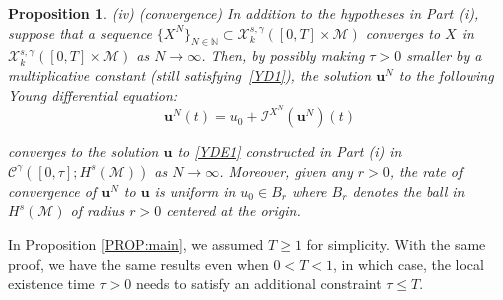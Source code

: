 \documentclass[letterpaper, 11pt,  reqno]{amsart}
\newtheorem{proposition}[theorem]{Proposition}
\newcommand{\1}{\hspace{0.5mm}\text{I}\hspace{0.5mm}}
\newcommand{\I}{\mathcal{I}}
\newcommand{\noi}{\noindent}
\newcommand{\CC}{\mathcal{C}}
\newcommand{\g}{\gamma}
\newcommand{\M}{\mathcal{M}}
\newcommand{\N}{\mathbb{N}}
\newcommand{\cX}{\mathcal{X}}
\newcommand{\uu}{\mathbf{u}}
\numberwithin{equation}{section}
\numberwithin{theorem}{section}
\begin{document}
\begin{proposition}
\smallskip

\noi
\textup{(iv) (convergence)}
In addition to the hypotheses in Part (i), 
suppose  that a sequence $\{X^N\}_{N \in \N}\subset 
 \cX^{s, \g}_k([0, T]\times \M)$
 converges to $X$ in 
 $ \cX^{s, \g}_k([0, T]\times \M)$ as $N \to \infty$.
Then, 
by possibly making $\tau > 0$ smaller by a multiplicative constant 
\textup{(}still satisfying~\eqref{YD1}\textup{)},  the solution 
$\uu^N$  %
to the following Young differential equation\textup{:}
\begin{equation}
\label{YDE2}
\uu^N(t) = u_0 + \I^{X^N}(\uu^N)(t)
\end{equation}

\noi
converges to the solution $\uu$ to \eqref{YDE1}
constructed in Part (i)  
 in $\CC^\g([0, \tau]; H^s(\M))$
as $N \to \infty$.
Moreover, 
given any $r > 0$, 
the rate of convergence of $\uu^N$ to $\uu$ is
uniform in $u_0 \in B_r$ 
where
$B_r$ denotes the ball 
in $H^s(\M)$
of radius $r > 0$ centered at the origin.



\end{proposition}


In Proposition \ref{PROP:main}, 
we assumed $T \ge 1$
for simplicity.
With the same proof, 
we have the same results even when $0 < T < 1$, 
in which case, 
the local existence time $\tau > 0$ 
needs to satisfy an additional constraint $\tau \le T$. 
\end{document}
